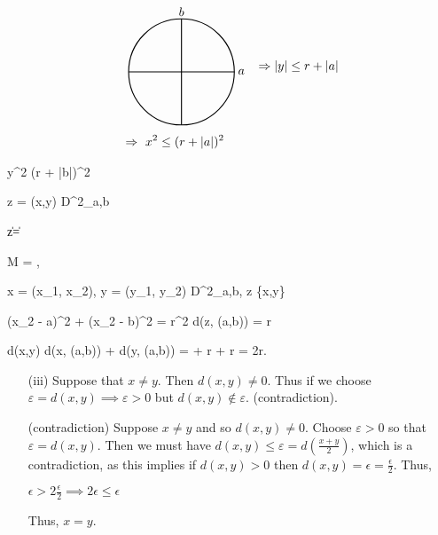 \documentclass{article}
\theoremstyle{definition}
\numberwithin{equation}{section}
\begin{document}
\begin{align*}
    &\begin{array}{c}
    \begin{tikzpicture}
        \draw[thick] (0,0) circle (1.5cm);
        \draw[thick] (-1.5,0) -- (1.5,0);
        \draw[thick] (0,-1.5) -- (0,1.5);
        \node at (1.7,0) {$a$};
        \node at (0,1.7) {$b$};
    \end{tikzpicture}
    \end{array}
    \Rightarrow |y| \leq r + |a| \\
    &\Rightarrow \ x^2 \leq (r + |a|)^2
\end{align*}

 \quad y^2 \leq (r + |b|)^2

\forall z = (x,y) \in D^2_{a,b}

\|z\| = 
\leq {}

 \quad M = , \quad {}


 \quad x = (x_1, x_2), \quad y = (y_1, y_2) \in D^2_{a,b}, \quad z \in \{x,y\}

(x_2 - a)^2 + (x_2 - b)^2 = r^2
\Rightarrow d(z, (a,b)) =  \leq r

\Rightarrow d(x,y) \leq d(x, (a,b)) + d(y, (a,b))
=  + 
\leq r + r = 2r.

\begin{itemize}
    \item[(iii)] Suppose that \(x \neq y\). Then \(d(x,y) \neq 0\). Thus if we choose \(\varepsilon = d(x,y) \implies \varepsilon > 0\) but \(d(x,y) \notin \varepsilon\). (contradiction).
\end{itemize}

\begin{itemize}
    \item[(contradiction)] Suppose \(x \neq y\) and so \(d(x,y) \neq 0\). Choose \(\varepsilon > 0\) so that \(\varepsilon = d(x,y)\). Then we must have \(d(x,y) \leq \varepsilon = d(\frac{x+y}{2})\), which is a contradiction, as this implies if \(d(x,y) > 0\) then \(d(x,y) = \epsilon = \frac{\epsilon}{2}\). Thus,

    $
    \epsilon > 2 \frac{\epsilon}{2} \implies 2 \epsilon \leq \epsilon
    $

    Thus, \(x = y\).
\end{itemize}
\end{document}
